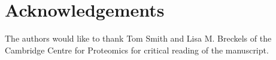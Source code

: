 \documentclass[12pt,english]{article}
\begin{document}

 
 
\section*{Acknowledgements}
The authors would like to thank Tom Smith and Lisa M. Breckels of the Cambridge Centre for Proteomics for critical reading of the manuscript. 




\clearpage
\printbibliography
\end{document}
